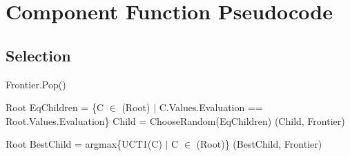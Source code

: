 \section{Component Function Pseudocode}
\label{appendix:componentfunctions}

\subsection*{Selection}
\begin{algorithm}[H]
    \begin{algorithmic}[1]
            \State \Return Frontier.Pop()
        \EndProcedure
    \end{algorithmic}    
\end{algorithm}

\begin{algorithm}[H]
    \begin{algorithmic}[1]
                \State \Return Root
            \Else
                \State EqChildren = \{C $\in$ (Root) $|$ C.Values.Evaluation == Root.Values.Evaluation\}
                \State Child = ChooseRandom(EqChildren)
                \State \Return {}(Child, Frontier)
            \EndIf
        \EndProcedure
    \end{algorithmic}    
\end{algorithm}

\begin{algorithm}[H]
    \begin{algorithmic}[1]
                \State \Return Root
            \EndIf
            \State BestChild = argmax\{UCT1(C) $|$ C $\in$ (Root)\}
            \State \Return {}(BestChild, Frontier)
        \EndProcedure
    \end{algorithmic}    
\end{algorithm}

